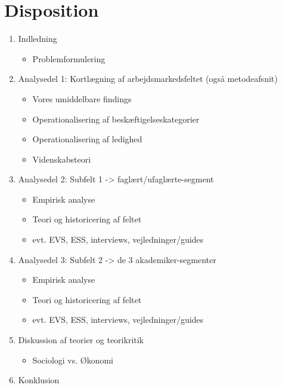 \section{Disposition \label{}}
%
 \begin{enumerate} [topsep=6pt,itemsep=-1ex]
   \item Indledning
		 \begin{itemize} [topsep=0pt,itemsep=0ex]
		 	\item Problemformulering	
	 	 \end{itemize}
   \item Analysedel 1: Kortlægning af arbejdsmarkedsfeltet (også metodeafsnit)
   		 \begin{itemize} [topsep=0pt,itemsep=0ex]
		 	\item Vores umiddelbare findings
		 	\item Operationalisering af beskæftigelseskategorier
		 	\item Operationalisering af ledighed
		 	\item Videnskabsteori
	 	 \end{itemize}
   \item Analysedel 2: Subfelt 1 -> faglært/ufaglærte-segment
 		 \begin{itemize} [topsep=0pt,itemsep=0ex]
		 	\item Empirisk analyse
		 	\item Teori og historicering af feltet
		 	\item evt. EVS, ESS, interviews, vejledninger/guides
	 	 \end{itemize}
   \item Analysedel 3: Subfelt 2 -> de 3 akademiker-segmenter
   		 \begin{itemize} [topsep=0pt,itemsep=0ex]
 		 	\item Empirisk analyse
		 	\item Teori og historicering af feltet
		 	\item evt. EVS, ESS, interviews, vejledninger/guides
	 	 \end{itemize}
   \item Diskussion af teorier og teorikritik
   		 \begin{itemize} [topsep=0pt,itemsep=0ex]
   		 	\item Sociologi vs. Økonomi
  	 	 \end{itemize}
   \item Konklusion
 \end{enumerate}
%




